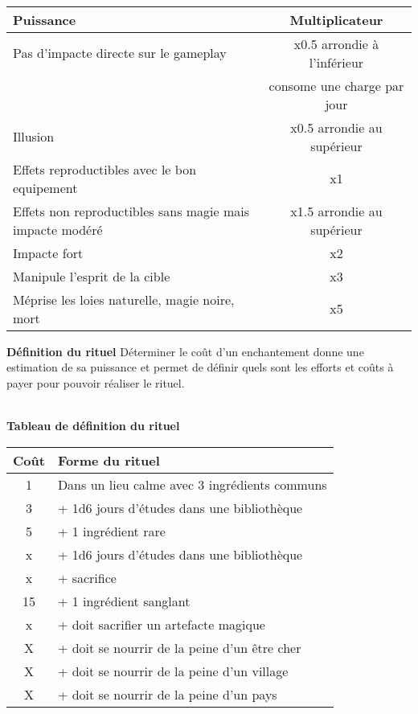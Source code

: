 \documentclass[11pt]{article} %
\newcommand{\myjump}[1][1]{\mbox{}\\[#1cm]}
\begin{document}
\myjump[0.35]
\begin{tabularx}{\linewidth}{|Xc|}
\hline

    \textbf{Puissance} & \textbf{Multiplicateur}\\
    \hline
    Pas d'impacte directe sur le gameplay & x0.5 arrondie à l'inférieur\\
    & consome une charge par jour\\
    Illusion & x0.5 arrondie au supérieur\\
    Effets reproductibles avec le bon equipement & x1\\
    Effets non reproductibles sans magie mais impacte modéré & x1.5 arrondie au supérieur\\
    Impacte fort & x2\\
    Manipule l'esprit de la cible & x3\\
    Méprise les loies naturelle, magie noire, mort & x5\\


\hline
\end{tabularx}

\newpage
\textbf{\huge Définition du rituel}\newline
Déterminer le coût d'un enchantement donne une estimation de sa puissance et permet de définir quels sont les efforts et coûts à payer pour pouvoir réaliser le rituel.

\myjump[0]
\textbf{Tableau de définition du rituel}\newline
\begin{tabularx}{\linewidth}{|c|X|}
\hline
    \textbf{Coût} & \textbf{Forme du rituel}\\
    \hline
    1    & Dans un lieu calme avec 3 ingrédients communs\\
    3 & + 1d6 jours d'études dans une bibliothèque\\
    5 & + 1 ingrédient rare\\
    x & + 1d6 jours d'études dans une bibliothèque\\
    x & + sacrifice\\
    15 & + 1 ingrédient sanglant\\
    x & + doit sacrifier un artefacte magique\\
    X & + doit se nourrir de la peine d'un être cher\\
    X & + doit se nourrir de la peine d'un village\\
    X & + doit se nourrir de la peine d'un pays\\

\hline
\end{tabularx}
\end{document}
